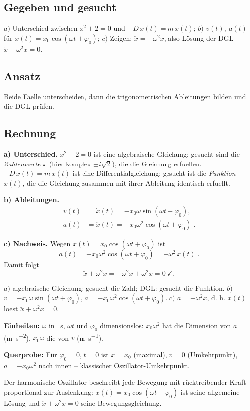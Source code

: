 
\subsection*{Gegeben und gesucht}
$a)$ Unterschied zwischen $x^2+2=0$ und $-D\,x(t)=m\,\ddot x(t)$; $b)$
$v(t),\ a(t)$ für $x(t)=x_0\cos(\omega t+\varphi_0)$; $c)$ Zeigen:
$\ddot x=-\omega^2x$, also Lösung der DGL $\ddot x+\omega^2x=0$.

\subsection*{Ansatz}
Beide Faelle unterscheiden, dann die trigonometrischen Ableitungen bilden
und die DGL prüfen.

\subsection*{Rechnung}
\textbf{a) Unterschied.} $x^2+2=0$ ist eine algebraische Gleichung; gesucht
sind die \emph{Zahlenwerte} $x$ (hier komplex $\pm i\sqrt2$), die die
Gleichung erfuellen. $-D\,x(t)=m\,\ddot x(t)$ ist eine
Differentialgleichung; gesucht ist die \emph{Funktion} $x(t)$, die die
Gleichung zusammen mit ihrer Ableitung identisch erfuellt.

\textbf{b) Ableitungen.}
\begin{align}
  v(t)&=\dot x(t)=-x_0\omega\sin(\omega t+\varphi_0),\\
  a(t)&=\ddot x(t)=-x_0\omega^2\cos(\omega t+\varphi_0)\;.
\end{align}

\textbf{c) Nachweis.} Wegen $x(t)=x_0\cos(\omega t+\varphi_0)$ ist
\begin{equation}
  a(t)=-x_0\omega^2\cos(\omega t+\varphi_0)=-\omega^2\,x(t)\;.
\end{equation}
Damit folgt
\begin{equation}
  \ddot x+\omega^2x=-\omega^2x+\omega^2x=0\;\checkmark.
\end{equation}

\begin{ergebnis}
$a)$ algebraische Gleichung: gesucht die Zahl; DGL: gesucht die Funktion.
$b)$ $v=-x_0\omega\sin(\omega t+\varphi_0)$, $a=-x_0\omega^2\cos(\omega t+\varphi_0)$.
$c)$ $a=-\omega^2x$, d. h. $x(t)$ loest $\ddot x+\omega^2x=0$.
\end{ergebnis}

\begin{kontrolle}
\textbf{Einheiten:} $\omega$ in \unit{\per\second}, $\omega t$ und
$\varphi_0$ dimensionslos; $x_0\omega^2$ hat die Dimension von $a$
(\unit{\metre\per\second\squared}), $x_0\omega$ die von $v$
(\unit{\metre\per\second}). \checkmark

\textbf{Querprobe:} Für $\varphi_0=0$, $t=0$ ist $x=x_0$ (maximal),
$v=0$ (Umkehrpunkt), $a=-x_0\omega^2$ nach innen -- klassischer
Oszillator-Umkehrpunkt. \checkmark
\end{kontrolle}

\begin{merksatz}
Der harmonische Oszillator beschreibt jede Bewegung mit rücktreibender
Kraft proportional zur Auslenkung: $x(t)=x_0\cos(\omega t+\varphi_0)$ ist
seine allgemeine Lösung und $\ddot x+\omega^2x=0$ seine Bewegungsgleichung.
\end{merksatz}
